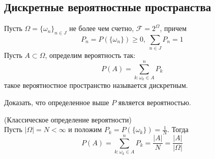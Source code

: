 \documentclass[a4paper, 12pt]{article}
\begin{document}
\subsection{Дискретные вероятностные пространства}
\begin{definition}
    Пусть $\Omega=\{\omega_n\}_{n\in J}$ не более чем счетно, $\mathcal{F}=2^{\Omega}$, причем
    \[P_n=P(\{\omega_n\})\geq 0,\ \sum_{n\in J} P_n =1\]
    Пусть $A\subset \Omega$, определим вероятность так:
    \[P(A)=\sum\limits_{k: \omega_k\in A}^{n}P_k\]
    такое вероятностное пространство называется дискретным.
\end{definition}
\begin{exercise}
    Доказать, что определенное выше $P$ является вероятностью.
\end{exercise}
\begin{definition} (Классическое определение вероятности)\\
    Пусть $|\Omega|=N<\infty$ и положим $P_k=P(\{\omega_k\})=\frac{1}{N}$. Тогда
    \[P(A)=\sum\limits_{k: \omega_k\in A}^{n}P_k=\frac{|A|}{N}=\frac{|A|}{|\Omega|}\]
\end{definition}
\end{document}
